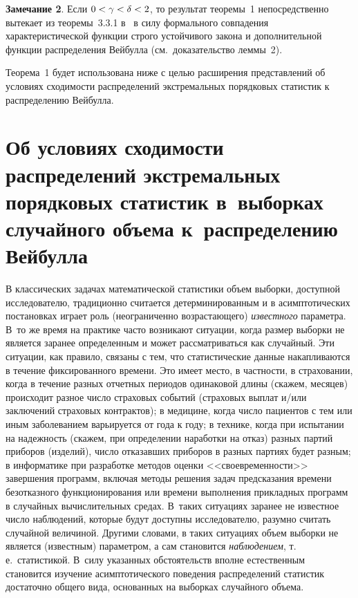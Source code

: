 \begin{multicols}{2}
\smallskip

\noindent
\textbf{Замечание 2}. Если $0\hm<\gamma\hm<\delta\hm<2$, то результат теоремы~1
непосредственно вытекает из теоремы~3.3.1 в~\cite{Zolotarev1983} в
силу формального совпадения характеристической функции строго
устойчивого закона и дополнительной функции распределения Вейбулла
(см.\ доказательство леммы~2).

\smallskip

Теорема~1 будет использована ниже с целью расширения представлений
об условиях сходимости распределений экстремальных порядковых
статистик к распределению Вейбулла.

\section{Об условиях сходимости распределений экстремальных порядковых
статистик в~выборках случайного объема к~распределению Вейбулла}

В классических задачах математической статистики объем выборки,
доступной исследователю, традиционно считается детерминированным и в
асимптотических постановках играет роль (неограниченно
возрастающего) {\it известного} па\-ра\-мет\-ра. В~то же время на практике
часто возникают ситуации, когда размер выборки не является заранее
определенным и может рассматриваться как случайный. Эти ситуации,
как правило, связаны с тем, что статистические данные накапливаются
в течение фиксированного времени. Это имеет место, в частности, в
страховании, когда в течение разных отчетных периодов одинаковой
длины (скажем, месяцев) происходит разное число страховых событий
(страховых выплат и/или заключений страховых контрактов); в
медицине, когда число пациентов с тем или иным заболеванием
варьируется от года к году; в технике, когда при испытании на
надежность (скажем, при определении наработки на отказ) разных
партий приборов (изделий), число отказавших приборов в разных
партиях будет разным; в информатике при разработке методов оценки
<<своевременности>> завершения программ, включая методы решения задач
предсказания времени безотказного функционирования или времени
выполнения прикладных программ в случайных вычислительных средах.
В~таких ситуациях заранее не известное число наблюдений, которые будут
доступны исследователю, разумно считать случайной величиной. Другими
словами, в таких ситуациях объем выборки не является (известным)
па\-ра\-мет\-ром, а сам становится {\it наблюдением}, т.\,е.\ статистикой.
В~силу указанных обстоятельств вполне естественным становится
изучение асимптотического поведения распределений статистик
достаточно общего вида, основанных на выборках случайного объема.


\end{multicols}
